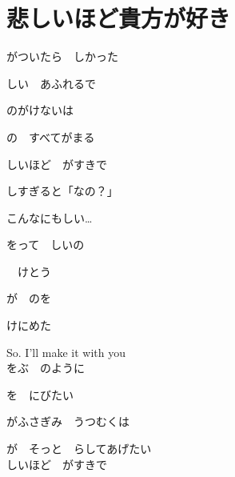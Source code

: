 \section{ 悲しいほど貴方が好き}

\large{

がついたら　しかった

しい　あふれるで

のがけないは

の　すべてがまる
\\


しいほど　がすきで

しすぎると「なの？」

こんなにもしい…

をって　しいの

　けとう

が　のを

けにめた

So. I'll make it with you
\\

をぶ　のように

を　にびたい

がふさぎみ　うつむくは

が　そっと　らしてあげたい
\\

しいほど　がすきで

}

